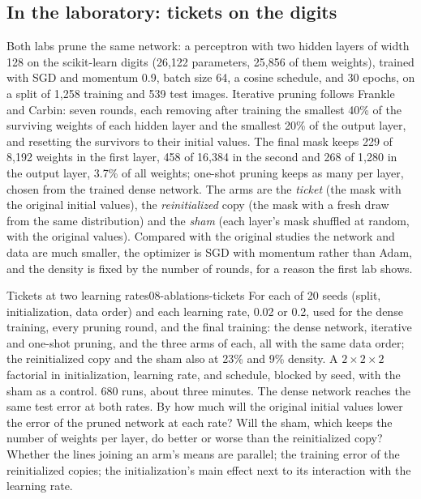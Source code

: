 \begin{refsection}
\section{In the laboratory: tickets on the digits}\label{sec:ablations:lab}

Both labs prune the same network: a perceptron with two hidden layers of width 128 on the scikit-learn digits (26,122 parameters, 25,856 of them weights), trained with SGD and momentum 0.9, batch size 64, a cosine schedule, and 30 epochs, on a split of 1,258 training and 539 test images. Iterative pruning follows Frankle and Carbin: seven rounds, each removing after training the smallest 40\% of the surviving weights of each hidden layer and the smallest 20\% of the output layer, and resetting the survivors to their initial values. The final mask keeps 229 of 8,192 weights in the first layer, 458 of 16,384 in the second and 268 of 1,280 in the output layer, 3.7\% of all weights; one-shot pruning keeps as many per layer, chosen from the trained dense network. The arms are the \emph{ticket} (the mask with the original initial values), the \emph{reinitialized} copy (the mask with a fresh draw from the same distribution) and the \emph{sham} (each layer's mask shuffled at random, with the original values). Compared with the original studies the network and data are much smaller, the optimizer is SGD with momentum rather than Adam, and the density is fixed by the number of rounds, for a reason the first lab shows.

\begin{lab}{Tickets at two learning rates}{08-ablations-tickets}\label{lab:ablations:tickets}
 For each of 20 seeds (split, initialization, data order) and each learning rate, 0.02 or 0.2, used for the dense training, every pruning round, and the final training: the dense network, iterative and one-shot pruning, and the three arms of each, all with the same data order; the reinitialized copy and the sham also at 23\% and 9\% density. A $2\times2\times2$ factorial in initialization, learning rate, and schedule, blocked by seed, with the sham as a control. 680 runs, about three minutes.
 The dense network reaches the same test error at both rates. By how much will the original initial values lower the error of the pruned network at each rate? Will the sham, which keeps the number of weights per layer, do better or worse than the reinitialized copy?
 Whether the lines joining an arm's means are parallel; the training error of the reinitialized copies; the initialization's main effect next to its interaction with the learning rate.
\end{lab}


\end{refsection}
